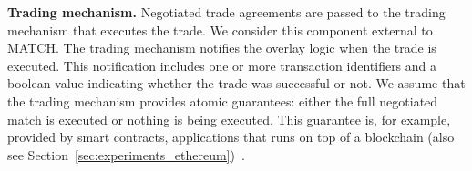 \textbf{Trading mechanism.}
Negotiated trade agreements are passed to the trading mechanism that executes the trade.
We consider this component external to MATCH.
The trading mechanism notifies the overlay logic when the trade is executed.
This notification includes one or more transaction identifiers and a boolean value indicating whether the trade was successful or not.
We assume that the trading mechanism provides atomic guarantees: either the full negotiated match is executed or nothing is being executed.
This guarantee is, for example, provided by smart contracts, applications that runs on top of a blockchain (also see Section~\ref{sec:experiments_ethereum})~\cite{luu2016making}.




